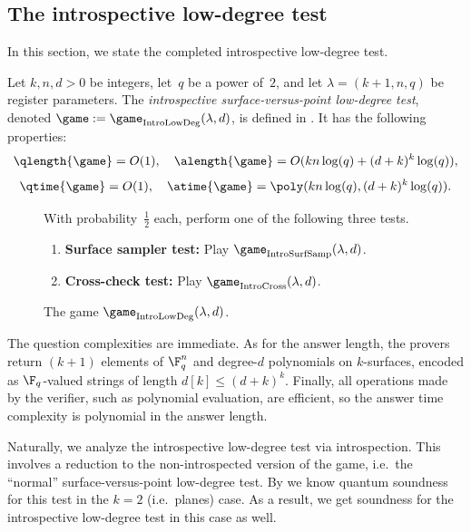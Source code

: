 \subsection{The introspective low-degree test}\label{sec:big-low-degree-subsection}

In this section, we state the completed introspective low-degree test.

\begin{definition}
Let $k, n, d>0$ be integers, let~$q$ be a power of~$2$,
and let $\lambda = (k+1, n, q)$ be register parameters.
The \emph{introspective surface-versus-point low-degree test},
denoted $\game:=\game_{\mathrm{IntroLowDeg}}(\lambda, d)$, is defined in .
It has the following properties:
\begin{equation*}
\qlength{\game} = O(1), \quad
\alength{\game} = O(k n \log(q) + (d+k)^k \log(q)),
\end{equation*}
\begin{equation*}
\qtime{\game} = O(1), \quad
\atime{\game} = \poly(k n \log(q), (d+k)^k \log(q)).
\end{equation*}
\end{definition}
{
\begin{figure}
With probability~$\tfrac{1}{2}$ each, perform one of the following three tests.
\begin{enumerate}
	\item \textbf{Surface sampler test:} Play $\game_{\mathrm{IntroSurfSamp}}(\lambda, d)$.
	\item \textbf{Cross-check test:} Play $\game_{\mathrm{IntroCross}}(\lambda, d)$.
	\end{enumerate}
	\caption{The game $\game_{\mathrm{IntroLowDeg}}(\lambda, d)$.\label{fig:big-low-degree}}
\end{figure}
}

The question complexities are immediate.
As for the answer length, the provers return $(k+1)$ elements of $\F_q^{n}$ and degree-$d$ polynomials on $k$-surfaces,
encoded as $\F_q$-valued strings of length $d[k] \leq (d+k)^k$.
Finally, all operations made by the verifier, such as polynomial evaluation, are efficient, so the answer time complexity is polynomial in the answer length.

Naturally, we analyze the introspective low-degree test
via introspection.
This involves a reduction to the non-introspected version of the game,
i.e.\ the ``normal'' surface-versus-point low-degree test.
By  we know quantum soundness for this test in the $k = 2$ (i.e.\ planes) case.
As a result, we get soundness for the introspective low-degree test in this case as well.

